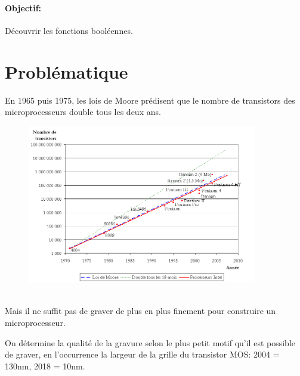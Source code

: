 \documentclass[a4paper,11pt]{article}
\begin{document}
\begin{Form}
\paragraph{Objectif:}Découvrir les fonctions booléennes.
\section{Problématique}
En 1965 puis 1975, les lois de Moore prédisent que le nombre de transistors des microprocesseurs double tous les deux ans.
\begin{figure}[!h]
\centering
\includegraphics[width=10cm]{ressources/loi-moore.png}
\label{moore}
\end{figure}
\\Mais il ne suffit pas de graver de plus en plus finement pour construire un microprocesseur.
\begin{commentprof}
On détermine la qualité de la gravure selon le plus petit motif qu'il est possible de graver, en l'occurrence la largeur de la grille du transistor MOS: 2004 = 130nm, 2018 = 10nm.
\end{commentprof}
\begin{center}
\end{center}
\begin{commentprof}

\end{commentprof}
\end{Form}
\end{document}
